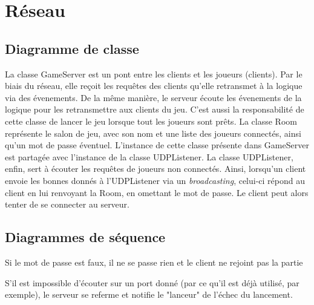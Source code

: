 \chapter{Réseau} \label{chapter:reseau}

    \section{Diagramme de classe}


        La classe GameServer est un pont entre les clients et les joueurs (clients).
        Par le biais du réseau, elle reçoit les requêtes des clients qu'elle
        retransmet à la logique via des évenements. De la même manière,
        le serveur écoute les évenements de la logique pour les retransmettre
        aux clients du jeu. C'est aussi la responsabilité de cette classe de
        lancer le jeu lorsque tout les joueurs sont prêts.
        \newline
        La classe Room représente le salon de jeu, avec son nom et une liste
        des joueurs connectés, ainsi qu'un mot de passe éventuel. L'instance
        de cette classe présente dans GameServer est partagée avec l'instance
        de la classe UDPListener.
        \newline
        La classe UDPListener, enfin, sert à écouter les requêtes de joueurs
        non connectés. Ainsi, lorsqu'un client envoie les bonnes donnés à
        l'UDPListener via un \textit{broadcasting}, celui-ci répond au client
        en lui renvoyant la Room, en omettant le mot de passe. Le client peut
        alors tenter de se connecter au serveur.

    \section{Diagrammes de séquence}

        Si le mot de passe est faux, il ne se passe rien et le client ne rejoint pas la partie

        S'il est impossible d'écouter sur un port donné (par ce qu'il est déjà utilisé, par exemple), le serveur
        se referme et notifie le "lanceur" de l'échec du lancement.

        \begin{landscape}
        \end{landscape}

